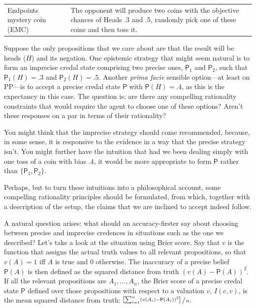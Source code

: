 \documentclass[
  10pt,
  dvipsnames,enabledeprecatedfontcommands]{scrartcl}
\begin{document}
\begin{center}
\begin{tabular}{lp{8.5cm}}
Endpoints mystery coin (EMC)  & The opponent will  produce two coins with the objective chances of Heads  $.3$ and $.5$, randomly pick one of these coins and then toss it.
\end{tabular}
\end{center}

\noindent Suppose the only propositions that we care about are that the
result will be heads (\(H\)) and its negation. One epistemic strategy
that might seem natural is to form an imprecise credal state comprising
two precise ones, \(\mathsf{P}_1\) and \(\mathsf{P}_2\), such that
\(\mathsf{P}_1(H)=.3\) and \(\mathsf{P}_2(H)=.5\). Another
\emph{prima facie} sensible option---at least on PP---is to accept a
precise credal state \(\mathsf{P}\) with \(\mathsf{P}(H)=.4\), as this
is the expectancy in this case. The question is: are there any
compelling rationality constraints that would require the agent to
choose one of these options? Aren't these responses on a par in terms of
their rationality?

You might think that the imprecise strategy should come recommended,
because, in some sense, it is responsive to the evidence in a way that
the precise strategy isn't. You might further have the intuition that
had we been dealing simply with one toss of a coin with bias \(.4\), it
would be more appropriate to form \(\mathsf{P}\) rather than
\(\{\mathsf{P}_1,\mathsf{P}_2\}\).

Perhaps, but to turn these intuitions into a philosophical account, some
compelling rationality principles should be formulated, from which,
together with a description of the setup, the claims that we are
inclined to accept indeed follow.

A natural question arises: what should an accuracy-firster say about
choosing between precise and imprecise credences in situations such as
the one we described? Let's take a look at the situation using Brier
score. Say that \(v\) is the function that assigns the actual truth
values to all relevant propositions, so that \(v(A)=1\) iff \(A\) is
true and \(0\) otherwise. The inaccuracy of a precise belief
\(\mathsf{P}(A)\) is then defined as the squared distance from truth
\((v(A)-\mathsf{P}(A))^2\). If all the relevant propositions are
\(A_1, \dots, A_n\), the Brier score of a precise credal state
\(\mathsf{P}\) defined over those propositions with respect to a
valuation \(v\), \(I(c,v)\), is the mean squared distance from truth:
\(\nicefrac{\left[\sum_{i=1}^n(v(A_i)-\mathsf{P}(A_i))^2\right]\,\,}{\,n}.\)
\end{document}
